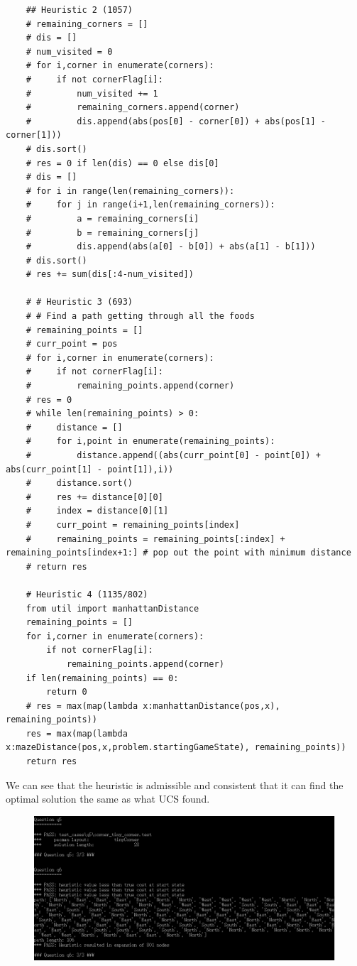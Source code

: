\documentclass[a4paper, 11pt]{article}
\begin{document}
\begin{lstlisting}
    ## Heuristic 2 (1057)
    # remaining_corners = []
    # dis = []
    # num_visited = 0
    # for i,corner in enumerate(corners):
    #     if not cornerFlag[i]:
    #         num_visited += 1
    #         remaining_corners.append(corner)
    #         dis.append(abs(pos[0] - corner[0]) + abs(pos[1] - corner[1]))
    # dis.sort()
    # res = 0 if len(dis) == 0 else dis[0]
    # dis = []
    # for i in range(len(remaining_corners)):
    #     for j in range(i+1,len(remaining_corners)):
    #         a = remaining_corners[i]
    #         b = remaining_corners[j]
    #         dis.append(abs(a[0] - b[0]) + abs(a[1] - b[1]))
    # dis.sort()
    # res += sum(dis[:4-num_visited])

    # # Heuristic 3 (693)
    # # Find a path getting through all the foods
    # remaining_points = []
    # curr_point = pos
    # for i,corner in enumerate(corners):
    #     if not cornerFlag[i]:
    #         remaining_points.append(corner)
    # res = 0
    # while len(remaining_points) > 0:
    #     distance = []
    #     for i,point in enumerate(remaining_points):
    #         distance.append((abs(curr_point[0] - point[0]) + abs(curr_point[1] - point[1]),i))
    #     distance.sort()
    #     res += distance[0][0]
    #     index = distance[0][1]
    #     curr_point = remaining_points[index]
    #     remaining_points = remaining_points[:index] + remaining_points[index+1:] # pop out the point with minimum distance
    # return res

    # Heuristic 4 (1135/802)
    from util import manhattanDistance
    remaining_points = []
    for i,corner in enumerate(corners):
        if not cornerFlag[i]:
            remaining_points.append(corner)
    if len(remaining_points) == 0:
        return 0
    # res = max(map(lambda x:manhattanDistance(pos,x), remaining_points))
    res = max(map(lambda x:mazeDistance(pos,x,problem.startingGameState), remaining_points))
    return res
\end{lstlisting}

We can see that the heuristic is admissible and consistent that it can find the optimal solution the same as what UCS found.
\begin{figure}[H]
  \centering
  \includegraphics[width=\linewidth]{fig/Q2.png}
\end{figure}
\end{document}
